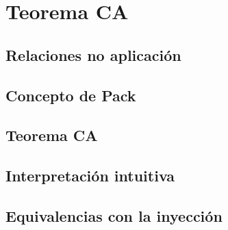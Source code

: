 \chapter{Teorema CA}

\newpage
\section{Relaciones no aplicación}

\newpage
\section{Concepto de Pack}

\newpage
\section{Teorema CA}

\newpage
\section{Interpretación intuitiva}

\newpage
\section{Equivalencias con la inyección}